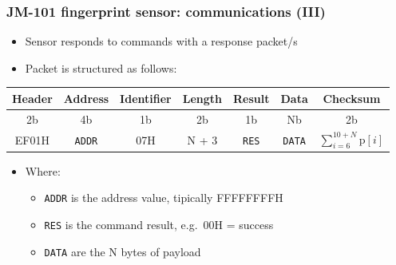 \documentclass[handout]{beamer}
\begin{document}
\begin{frame}
  \frametitle{JM-101 fingerprint sensor: communications (III)}

  \begin{itemize}
    \item Sensor responds to commands with a response packet/s
    \item Packet is structured as follows:
  \end{itemize}

  \begin{table}
    \centering
    \footnotesize
    \begin{tabular}{ccccccc}
      \toprule
      Header & Address       & Identifier & Length & Result       & Data          & Checksum                          \\
      \midrule
      2b     & 4b            & 1b         & 2b     & 1b           & Nb            & 2b                                \\
      \midrule
      EF01H  & \texttt{ADDR} & 07H        & N + 3  & \texttt{RES} & \texttt{DATA} & $\sum_{i=6}^{10+N} \textrm{p}[i]$ \\
      \bottomrule
    \end{tabular}
  \end{table}

  \begin{itemize}
    \item Where:
          \begin{itemize}
            \item \texttt{ADDR} is the address value, tipically FFFFFFFFH
            \item \texttt{RES} is the command result, e.g.\ 00H = success
            \item \texttt{DATA} are the N bytes of payload
          \end{itemize}
  \end{itemize}
\end{frame}
\end{document}
